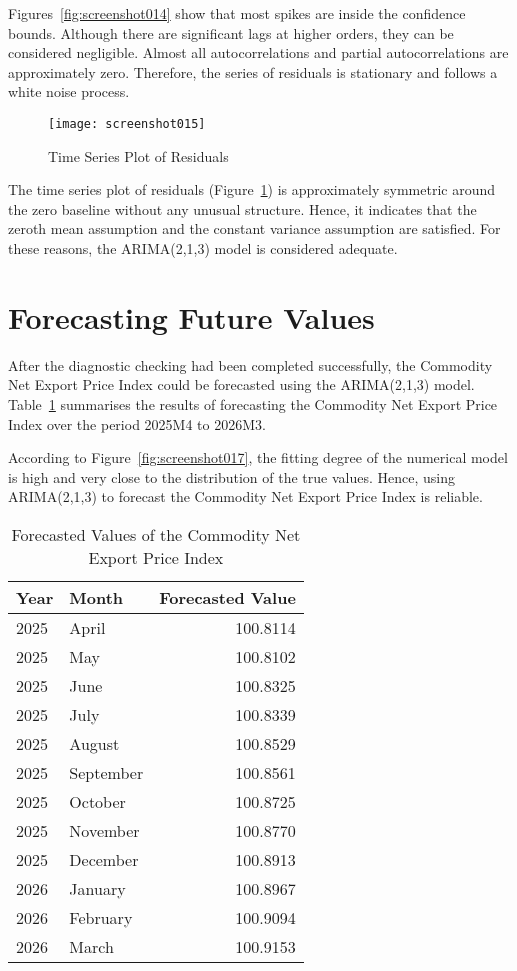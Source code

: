 \documentclass[12pt,a4paper]{report} %
\begin{document}
	Figures~\ref{fig:screenshot014} show that most spikes are inside the confidence bounds. Although there are significant lags at higher orders, they can be considered negligible. Almost all autocorrelations and partial autocorrelations are approximately zero. Therefore, the series of residuals is stationary and follows a white noise process.
	
	\begin{figure}[h!]
		\centering
		\texttt{[image: screenshot015]}
		\caption{Time Series Plot of Residuals}
		\label{fig:screenshot015}
	\end{figure}
	
	The time series plot of residuals (Figure~\ref{fig:screenshot015}) is approximately symmetric around the zero baseline without any unusual structure. Hence, it indicates that the zeroth mean assumption and the constant variance assumption are satisfied. For these reasons, the ARIMA(2,1,3) model is considered adequate.
	
	
	\section{Forecasting Future Values}
	\label{sec:forecasting}
	
	After the diagnostic checking had been completed successfully, the Commodity Net Export Price Index could be forecasted using the ARIMA(2,1,3) model. Table~\ref{tab:forecast_values} summarises the results of forecasting the Commodity Net Export Price Index over the period 2025M4 to 2026M3.
	
	According to Figure~\ref{fig:screenshot017}, the fitting degree of the numerical model is high and very close to the distribution of the true values. Hence, using ARIMA(2,1,3) to forecast the Commodity Net Export Price Index is reliable.
	
	\begin{table}[h!]
		\centering
		\caption{Forecasted Values of the Commodity Net Export Price Index}
		\label{tab:forecast_values}
		\begin{tabular}{l l r}
			\hline
			Year & Month & Forecasted Value \\
			\hline
			2025 & April      & 100.8114 \\
			2025 & May        & 100.8102 \\
			2025 & June       & 100.8325 \\
			2025 & July       & 100.8339 \\
			2025 & August     & 100.8529 \\
			2025 & September  & 100.8561 \\
			2025 & October    & 100.8725 \\
			2025 & November   & 100.8770 \\
			2025 & December   & 100.8913 \\
			2026 & January    & 100.8967 \\
			2026 & February   & 100.9094 \\
			2026 & March      & 100.9153 \\
			\hline
		\end{tabular}
	\end{table}
	
\end{document}
